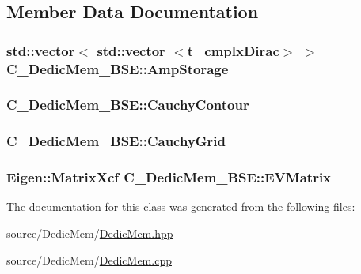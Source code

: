 \subsection{Member Data Documentation}
\hypertarget{class_c___dedic_mem___b_s_e_a532449af372b4823ec11c1bac16a39f6}{
\subsubsection[{Amp\-Storage}]{\setlength{\rightskip}{0pt plus 5cm}std\-::vector$<$ std\-::vector $<${\bf t\-\_\-cmplx\-Dirac}$>$ $>$ C\-\_\-\-Dedic\-Mem\-\_\-\-B\-S\-E\-::\-Amp\-Storage}}\label{class_c___dedic_mem___b_s_e_a532449af372b4823ec11c1bac16a39f6}
\hypertarget{class_c___dedic_mem___b_s_e_adcbf7c4206df13acafeab297bc039f29}{
\subsubsection[{Cauchy\-Contour}]{ C\-\_\-\-Dedic\-Mem\-\_\-\-B\-S\-E\-::\-Cauchy\-Contour}}\label{class_c___dedic_mem___b_s_e_adcbf7c4206df13acafeab297bc039f29}
\hypertarget{class_c___dedic_mem___b_s_e_a0d11282e491e4762101a83d7e80e5733}{
\subsubsection[{Cauchy\-Grid}]{ C\-\_\-\-Dedic\-Mem\-\_\-\-B\-S\-E\-::\-Cauchy\-Grid}}\label{class_c___dedic_mem___b_s_e_a0d11282e491e4762101a83d7e80e5733}
\hypertarget{class_c___dedic_mem___b_s_e_a5f0de44c8872d59b5db86058088e040e}{
\subsubsection[{E\-V\-Matrix}]{\setlength{\rightskip}{0pt plus 5cm}Eigen\-::\-Matrix\-Xcf C\-\_\-\-Dedic\-Mem\-\_\-\-B\-S\-E\-::\-E\-V\-Matrix}}\label{class_c___dedic_mem___b_s_e_a5f0de44c8872d59b5db86058088e040e}


The documentation for this class was generated from the following files\-:\begin{DoxyCompactItemize}
\item 
source/\-Dedic\-Mem/\hyperlink{_dedic_mem_8hpp}{Dedic\-Mem.\-hpp}\item 
source/\-Dedic\-Mem/\hyperlink{_dedic_mem_8cpp}{Dedic\-Mem.\-cpp}\end{DoxyCompactItemize}

